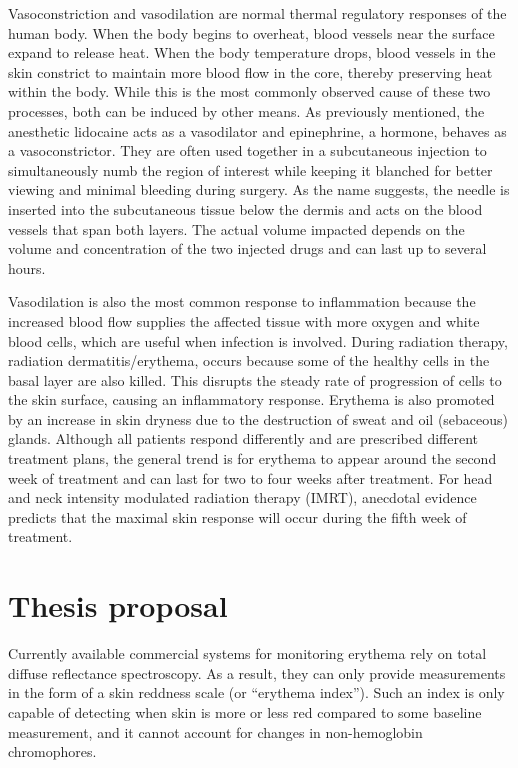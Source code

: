 Vasoconstriction and vasodilation are normal thermal regulatory responses of the human body.\cite{Kellogg2012} When the body begins to overheat, blood vessels near the surface expand to release heat. When the body temperature drops, blood vessels in the skin constrict to maintain more blood flow in the core, thereby preserving heat within the body. While this is the most commonly observed cause of these two processes, both can be induced by other means. As previously mentioned, the anesthetic lidocaine acts as a vasodilator and epinephrine, a hormone, behaves as a vasoconstrictor. They are often used together in a subcutaneous injection to simultaneously numb the region of interest while keeping it blanched for better viewing and minimal bleeding during surgery. As the name suggests, the needle is inserted into the subcutaneous tissue below the dermis and acts on the blood vessels that span both layers. The actual volume impacted depends on the volume and concentration of the two injected drugs and can last up to several hours.

Vasodilation is also the most common response to inflammation because the increased blood flow supplies the affected tissue with more oxygen and white blood cells, which are useful when infection is involved. During radiation therapy, radiation dermatitis/erythema, occurs because some of the healthy cells in the basal layer are also killed.\cite{McQuestion2006} This disrupts the steady rate of progression of cells to the skin surface, causing an inflammatory response. Erythema is also promoted by an increase in skin dryness due to the destruction of sweat and oil (sebaceous) glands. Although all patients respond differently and are prescribed different treatment plans, the general trend is for erythema to appear around the second week of treatment and can last for two to four weeks after treatment. For head and neck intensity modulated radiation therapy (IMRT), anecdotal evidence predicts that the maximal skin response will occur during the fifth week of treatment.

\section{Thesis proposal}
Currently available commercial systems for monitoring erythema rely on total diffuse reflectance spectroscopy. As a result, they can only provide measurements in the form of a skin reddness scale (or ``erythema index''). Such an index is only capable of detecting when skin is more or less red compared to some baseline measurement, and it cannot account for changes in non-hemoglobin chromophores.


